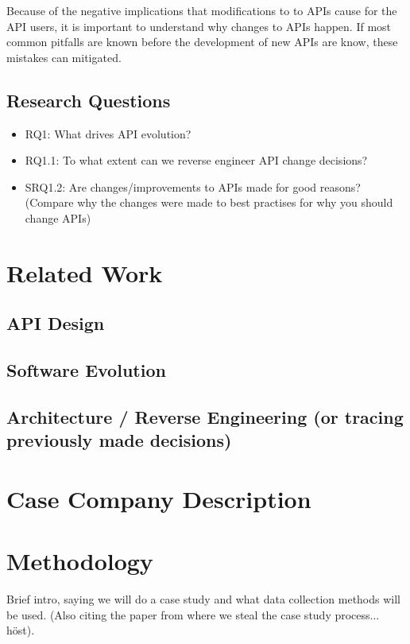 \documentclass[10pt,twocolumn]{article}
\begin{document}
Because of the negative implications that modifications to to APIs cause for the API users, it is important to understand why changes to APIs happen. If most common pitfalls are known before the development of new APIs are know, these mistakes can mitigated. 


\subsection{Research Questions}
\begin{itemize}
\item RQ1: What drives API evolution? 
\item RQ1.1: To what extent can we reverse engineer API change decisions?
\item SRQ1.2: Are changes/improvements to APIs made for good reasons? (Compare why the changes were made to best practises for why you should change APIs)
\end{itemize}


\section{Related Work}

\subsection{API Design}

\subsection{Software Evolution}

\subsection{Architecture / Reverse Engineering (or tracing previously made decisions)}

\section{Case Company Description}



\section{Methodology}
Brief intro, saying we will do a case study and what data collection methods will be used. (Also citing the paper from where we steal the case study process... höst).
\end{document}
